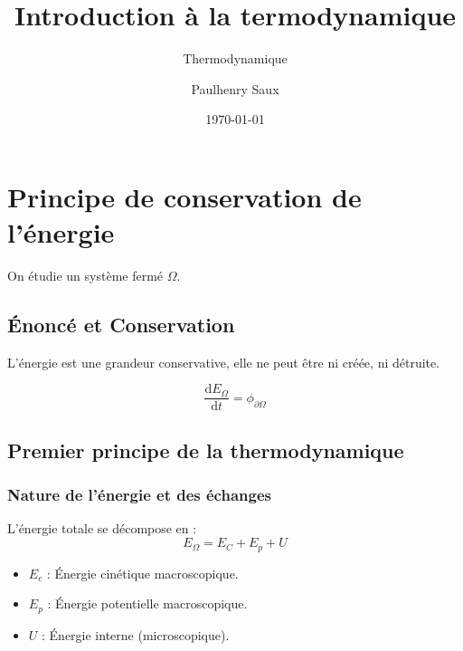 \documentclass[french]{yLectureNote}
\title{Introduction à la termodynamique}
\subtitle{Thermodynamique}
\author{Paulhenry Saux}
\date{\today}
\newcommand{\dd}[0]{\mathrm{d}}
\begin{document}
\setcounter{chapter}{2}
\chapter{Principe de conservation de l'énergie}

On étudie un système fermé $\Omega$.

\section{Énoncé et Conservation}

\begin{theorem}
    L'énergie est une grandeur conservative, elle ne peut \^etre ni créée, ni détruite.
\end{theorem}



\begin{theorem}
    $$\frac{\dd E_{\Omega}}{\dd t} = \phi_{\partial \Omega}$$
\end{theorem}

\section{Premier principe de la thermodynamique}

\subsection{Nature de l'énergie et des échanges}
L'énergie totale se décompose en :
$$E_{\Omega} = E_{C} + E_p + U$$
\begin{itemize}
    \item $E_c$ : Énergie cinétique macroscopique.
    \item $E_p$ : Énergie potentielle macroscopique.
    \item $U$ : Énergie interne (microscopique).
\end{itemize}
\end{document}
